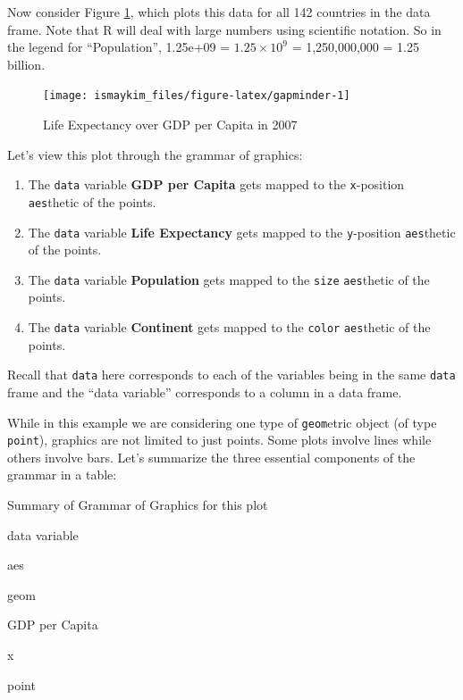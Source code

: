 \documentclass[12pt,]{krantz}
\providecommand{\tightlist}{%
  \setlength{\itemsep}{0pt}\setlength{\parskip}{0pt}}
\begin{document}
Now consider Figure \ref{fig:gapminder}, which plots this data for all
142 countries in the data frame. Note that R will deal with large
numbers using scientific notation. So in the legend for ``Population'',
1.25e+09 = \(1.25 \times 10^{9}\) = 1,250,000,000 = 1.25 billion.

\begin{figure}

{\centering \texttt{[image: ismaykim\_files/figure-latex/gapminder-1]} 

}

\caption{Life Expectancy over GDP per Capita in 2007}\label{fig:gapminder}
\end{figure}

Let's view this plot through the grammar of graphics:

\begin{enumerate}
\def\labelenumi{\arabic{enumi}.}
\tightlist
\item
  The \texttt{data} variable \textbf{GDP per Capita} gets mapped to the
  \texttt{x}-position \texttt{aes}thetic of the points.
\item
  The \texttt{data} variable \textbf{Life Expectancy} gets mapped to the
  \texttt{y}-position \texttt{aes}thetic of the points.
\item
  The \texttt{data} variable \textbf{Population} gets mapped to the
  \texttt{size} \texttt{aes}thetic of the points.
\item
  The \texttt{data} variable \textbf{Continent} gets mapped to the
  \texttt{color} \texttt{aes}thetic of the points.
\end{enumerate}

Recall that \texttt{data} here corresponds to each of the variables
being in the same \texttt{data} frame and the ``data variable''
corresponds to a column in a data frame.

While in this example we are considering one type of \texttt{geom}etric
object (of type \texttt{point}), graphics are not limited to just
points. Some plots involve lines while others involve bars. Let's
summarize the three essential components of the grammar in a table:

\label{tab:unnamed-chunk-17}Summary of Grammar of Graphics for this plot

data variable

aes

geom

GDP per Capita

x

point
\end{document}

